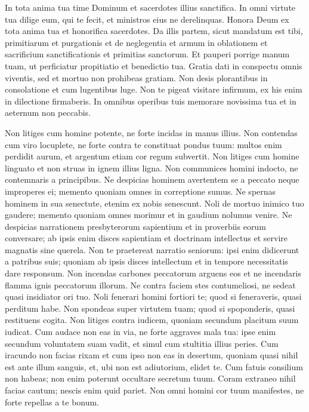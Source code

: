 \begin{biblechapter}
\verse In tota anima tua time Dominum et sacerdotes illius sanctifica. 
\verse In omni virtute tua dilige eum, qui te fecit, et ministros eius ne derelinquas. 
\verse Honora Deum ex tota anima tua et honorifica sacerdotes. 
\verse Da illis partem, sicut mandatum est tibi, primitiarum et purgationis et de neglegentia 
\verse et armum in oblationem et sacrificium sanctificationis et primitias sanctorum. 
\verse Et pauperi porrige manum tuam, ut perficiatur propitiatio et benedictio tua. 
\verse Gratia dati in conspectu omnis viventis, sed et mortuo non prohibeas gratiam. 
\verse Non desis plorantibus in consolatione et cum lugentibus luge. 
\verse Non te pigeat visitare infirmum, ex his enim in dilectione firmaberis. 
\verse In omnibus operibus tuis memorare novissima tua et in aeternum non peccabis. 
\end{biblechapter}

\begin{biblechapter}  
\verse Non litiges cum homine potente, ne forte incidas in manus illius. 
\verse Non contendas cum viro locuplete, ne forte contra te constituat pondus tuum: 
\verse multos enim perdidit aurum, et argentum etiam cor regum subvertit. 
\verse Non litiges cum homine linguato et non struas in ignem illius ligna. 
\verse Non communices homini indocto, ne contemnaris a principibus. 
\verse Ne despicias hominem avertentem se a peccato neque improperes ei; memento quoniam omnes in correptione sumus. 
\verse Ne spernas hominem in sua senectute, etenim ex nobis senescunt. 
\verse Noli de mortuo inimico tuo gaudere; memento quoniam omnes morimur et in gaudium nolumus venire. 
\verse Ne despicias narrationem presbyterorum sapientium et in proverbiis eorum conversare; 
\verse ab ipsis enim disces sapientiam et doctrinam intellectus et servire magnatis sine querela. 
\verse Non te praetereat narratio seniorum: ipsi enim didicerunt a patribus suis; 
\verse quoniam ab ipsis disces intellectum et in tempore necessitatis dare responsum. 
\verse Non incendas carbones peccatorum arguens eos et ne incendaris flamma ignis peccatorum illorum. 
\verse Ne contra faciem stes contumeliosi, ne sedeat quasi insidiator ori tuo. 
\verse Noli fenerari homini fortiori te; quod si feneraveris, quasi perditum habe. 
\verse Non spondeas super virtutem tuam; quod si spoponderis, quasi restituens cogita. 
\verse Non litiges contra iudicem, quoniam secundum placitum suum iudicat. 
\verse Cum audace non eas in via, ne forte aggraves mala tua: ipse enim secundum voluntatem suam vadit, et simul cum stultitia illius peries. 
\verse Cum iracundo non facias rixam et cum ipso non eas in desertum, quoniam quasi nihil est ante illum sanguis, et, ubi non est adiutorium, elidet te. 
\verse Cum fatuis consilium non habeas; non enim poterunt occultare secretum tuum. 
\verse Coram extraneo nihil facias cautum; nescis enim quid pariet. 
\verse Non omni homini cor tuum manifestes, ne forte repellas a te bonum. 
\end{biblechapter}

